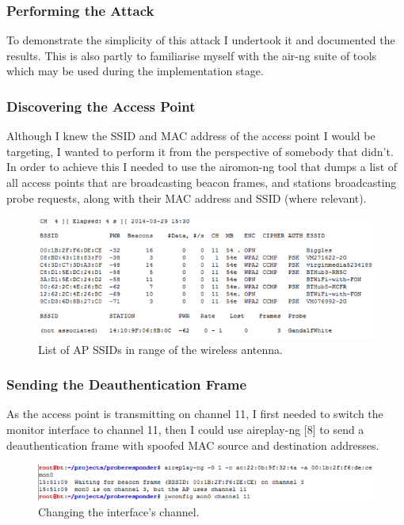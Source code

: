 \subsubsection*{Performing the Attack}
To demonstrate the simplicity of this attack I undertook it and documented the results. This is also partly to familiarise myself with the air-ng suite of tools which may be used during the implementation stage. 

\subsubsection*{Discovering the Access Point}
Although I knew the SSID and MAC address of the access point I would be targeting, I wanted to perform it from the perspective of somebody that didn’t. In order to achieve this I needed to use the airomon-ng tool that dumps a list of all access points that are broadcasting beacon frames, and stations broadcasting probe requests, along with their MAC address and SSID (where relevant).

\begin{figure}[h!]
\includegraphics[width=\linewidth]{research/attackvectors/figures/ddos-1.png}
\caption{List of AP SSIDs in range of the wireless antenna.}
\end{figure}

\subsubsection*{Sending the Deauthentication Frame}
As the access point is transmitting on channel 11, I first needed to switch the monitor interface to channel 11, then I could use aireplay-ng [8] to send a deauthentication frame with spoofed MAC source and destination addresses.

\begin{figure}[h!]
\includegraphics[width=\linewidth]{research/attackvectors/figures/ddos-2.png}
\caption{Changing the interface's channel.}
\end{figure}

